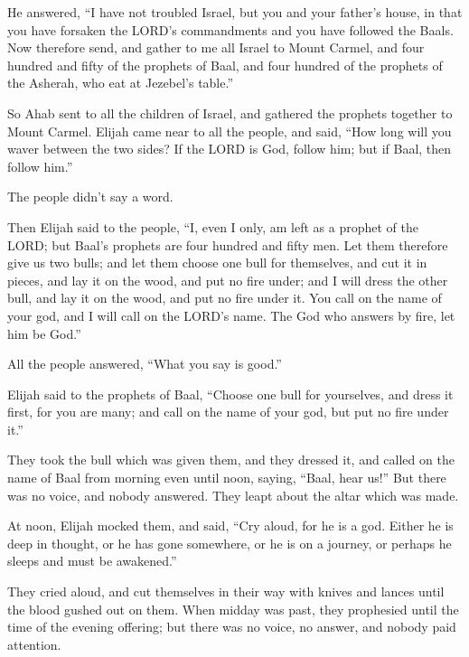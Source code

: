  He answered, ``I have not troubled Israel, but you and
your father's house, in that you have forsaken the LORD's commandments
and you have followed the Baals.  Now therefore send, and
gather to me all Israel to Mount Carmel, and four hundred and fifty of
the prophets of Baal, and four hundred of the prophets of the Asherah,
who eat at Jezebel's table.''

 So Ahab sent to all the children of Israel, and gathered
the prophets together to Mount Carmel.  Elijah came near
to all the people, and said, ``How long will you waver between the two
sides? If the LORD is God, follow him; but if Baal, then follow him.''

The people didn't say a word.

 Then Elijah said to the people, ``I, even I only, am
left as a prophet of the LORD; but Baal's prophets are four hundred and
fifty men.  Let them therefore give us two bulls; and let
them choose one bull for themselves, and cut it in pieces, and lay it on
the wood, and put no fire under; and I will dress the other bull, and
lay it on the wood, and put no fire under it.  You call
on the name of your god, and I will call on the LORD's name. The God who
answers by fire, let him be God.''

All the people answered, ``What you say is good.''

 Elijah said to the prophets of Baal, ``Choose one bull
for yourselves, and dress it first, for you are many; and call on the
name of your god, but put no fire under it.''

 They took the bull which was given them, and they
dressed it, and called on the name of Baal from morning even until noon,
saying, ``Baal, hear us!'' But there was no voice, and nobody answered.
They leapt about the altar which was made.

 At noon, Elijah mocked them, and said, ``Cry aloud, for
he is a god. Either he is deep in thought, or he has gone somewhere, or
he is on a journey, or perhaps he sleeps and must be awakened.''

 They cried aloud, and cut themselves in their way with
knives and lances until the blood gushed out on them. 
When midday was past, they prophesied until the time of the evening
offering; but there was no voice, no answer, and nobody paid attention.

